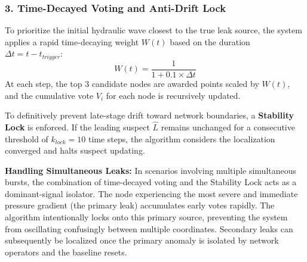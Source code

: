 \documentclass[final,5p,times,twocolumn,authoryear]{elsarticle}
\begin{document}
\subsubsection{3. Time-Decayed Voting and Anti-Drift Lock}
To prioritize the initial hydraulic wave closest to the true leak source, the system applies a rapid time-decaying weight $W(t)$ based on the duration $\Delta t = t - t_{trigger}$:
\begin{equation}
    W(t) = \frac{1}{1 + 0.1 \times \Delta t}
\end{equation}
At each step, the top 3 candidate nodes are awarded points scaled by $W(t)$, and the cumulative vote $V_i$ for each node is recursively updated. 

To definitively prevent late-stage drift toward network boundaries, a \textbf{Stability Lock} is enforced. If the leading suspect $\hat{L}$ remains unchanged for a consecutive threshold of $k_{lock} = 10$ time steps, the algorithm considers the localization converged and halts suspect updating. 

\textbf{Handling Simultaneous Leaks:} In scenarios involving multiple simultaneous bursts, the combination of time-decayed voting and the Stability Lock acts as a dominant-signal isolator. The node experiencing the most severe and immediate pressure gradient (the primary leak) accumulates early votes rapidly. The algorithm intentionally locks onto this primary source, preventing the system from oscillating confusingly between multiple coordinates. Secondary leaks can subsequently be localized once the primary anomaly is isolated by network operators and the baseline resets.
\end{document}
